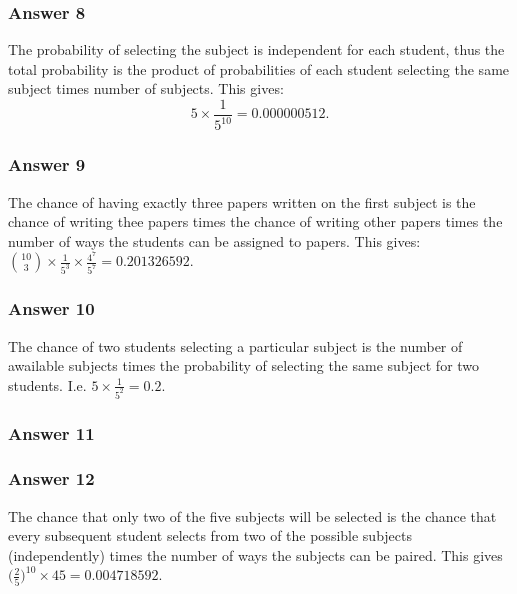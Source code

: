 \documentclass[11pt]{article}
\begin{document}
\subsubsection{Answer 8}
\label{sec-1-3-1}
The probability of selecting the subject is independent for each student,
thus the total probability is the product of probabilities of each student
selecting the same subject times number of subjects.  This gives:
\begin{equation*}
  5 \times \frac{1}{5^{10}} = \num{0.000000512}.
\end{equation*}
\subsubsection{Answer 9}
\label{sec-1-3-2}
The chance of having exactly three papers written on the first subject is
the chance of writing thee papers times the chance of writing other papers
times the number of ways the students can be assigned to papers.  This
gives:
$\binom{10}{3} \times \frac{1}{5^3} \times \frac{4^7}{5^7} = \num{0.201326592}$.
\subsubsection{Answer 10}
\label{sec-1-3-3}
The chance of two students selecting a particular subject is the number of
awailable subjects times the probability of selecting the same subject for
two students.  I.e. $5 \times \frac{1}{5^2} = 0.2$.
\subsubsection{Answer 11}
\label{sec-1-3-4}


\subsubsection{Answer 12}
\label{sec-1-3-5}
The chance that only two of the five subjects will be selected is the chance
that every subsequent student selects from two of the possible subjects
(independently) times the number of ways the subjects can be paired.  This
gives $\Big(\frac{2}{5}\Big)^{10} \times 45 = \num{0.004718592}$.
\end{document}
